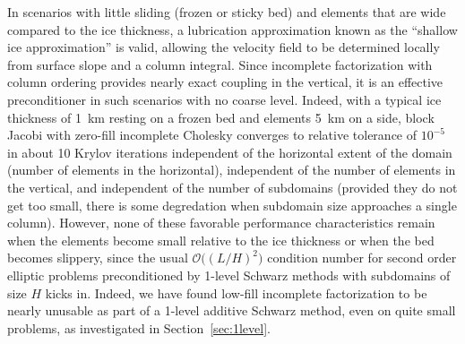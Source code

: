 \documentclass[3p]{elsarticle}
\newcommand{\bigO}{{\mathcal{O}}}
\begin{document}
In scenarios with little sliding (frozen or sticky bed) and elements that are wide compared to the
ice thickness, a lubrication approximation known as the ``shallow ice approximation'' is valid,
allowing the velocity field to be determined locally from surface slope and a column integral.
Since incomplete factorization with column ordering provides nearly exact coupling in the vertical,
it is an effective preconditioner in such scenarios with no coarse level.  Indeed, with a typical
ice thickness of \SI{1}{\kilo\metre} resting on a frozen bed and elements \SI{5}{\kilo\metre} on
a side, block Jacobi with zero-fill incomplete Cholesky converges to relative tolerance of $10^{-5}$
in about 10 Krylov iterations independent of the horizontal extent of the domain (number of elements
in the horizontal), independent of the number of elements in the vertical, and independent of the
number of subdomains (provided they do not get too small, there is some degredation when subdomain
size approaches a single column).  However, none of these favorable performance characteristics
remain when the elements become small relative to the ice thickness or when the bed becomes
slippery, since the usual $\bigO\big((L/H)^2\big)$ condition number for second order elliptic problems
preconditioned by 1-level Schwarz methods with subdomains of size $H$ kicks in.  Indeed, we have found low-fill incomplete factorization to be nearly unusable as part of a 1-level additive Schwarz method, even on quite small problems, as investigated in Section~\ref{sec:1level}.

\end{document}
